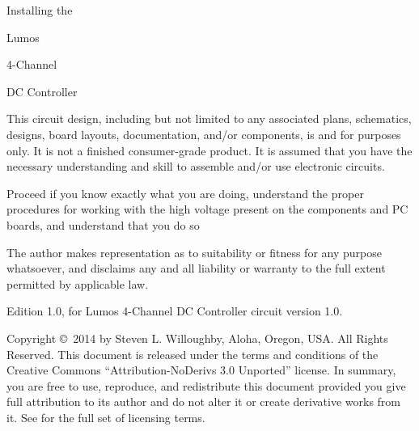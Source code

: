 \documentclass[letterpaper,twoside,onecolumn,openright,final]{memoir}
\begin{document}
\frontmatter

\thispagestyle{empty}
\vfill
\begin{center}
{\fontsize{48}{50}\selectfont
\strut Installing the \\\strut Lumos\TM\\\strut
4-Channel \\\strut DC Controller}

\vfill

\end{center}

\newpage
\begin{center}


\end{center}

This circuit design, including but not limited to any associated plans, schematics, designs, board layouts, documentation, 
and/or components, is  and for  purposes only. It is not a finished consumer-grade product.
It is assumed that you have the necessary understanding and skill to assemble and/or use electronic circuits.

Proceed  if you know exactly what you are doing, understand the proper procedures for working with the high voltage present on the components and PC boards, and understand that you do so 

The author makes  representation as to suitability or fitness for any purpose whatsoever, and disclaims any and all liability or warranty to the full extent permitted by applicable law.

\strut\vfill
\noindent Edition 1.0, for Lumos 4-Channel DC Controller circuit version 1.0.

\smallskip


\noindent Copyright \copyright\ 2014 by Steven L. Willoughby,
Aloha, Oregon, USA.  All Rights Reserved.  
This document is released under the terms and conditions of the 
Creative Commons ``Attribution-NoDerivs 3.0 Unported'' license.  
In summary, you are free to use, reproduce, and redistribute this 
document provided you give full attribution to its author and do not
alter it or create derivative works from it.  See
 for the full
set of licensing terms.
\end{document}
